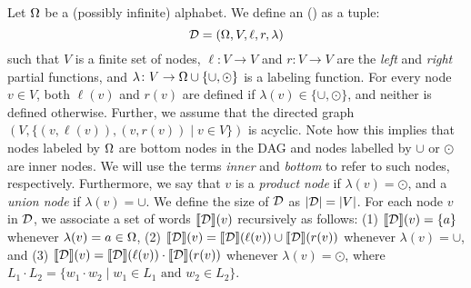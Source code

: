 Let $\Omega$ be a (possibly infinite) alphabet. We define an \emph{\dsnamebigcaps{}} (\dsabbr) as a tuple:
$$
\mathcal{D} = (\Omega, V, \ell, r, \lambda)
$$ 
such that $V$ is a finite set of nodes, $\ell\colon V\to V$ and $r\colon V\to V$ are the {\em left} and {\em right} partial functions, and $\lambda\colon V\to\Omega\cup\{\cup,\odot\}$ is a labeling function. For every node $v\in V$, both $\ell(v)$ and $r(v)$ are defined if $\lambda(v)\in\{\cup,\odot\}$, and neither is defined otherwise. Further, we assume that the directed graph $(V, \{(v,\ell(v)),(v,r(v))\mid v\in V\})$ is acyclic. Note how this implies that nodes labeled by $\Omega$ are bottom nodes in the DAG and nodes labelled by $\cup$ or $\odot$ are inner nodes. We will use the terms {\it inner} and {\it bottom} to refer to such nodes, respectively. Furthermore, we say that $v$ is a {\em product node} if $\lambda(v) = \odot$, and a {\em union node} if $\lambda(v) = \cup$. We define the size of $\mathcal{D}$ as $|\mathcal{D}| = |V|$.
For each node $v$ in $\mathcal{D}$, we associate a set of words ${\llbracket{\mathcal{D}}\rrbracket}(v)$ recursively as follows: (1) ${\llbracket{\mathcal{D}}\rrbracket}(v) = \{a\}$ whenever $\lambda(v) = a\in\Omega$, (2) ${\llbracket{\mathcal{D}}\rrbracket}(v) = {\llbracket{\mathcal{D}}\rrbracket}(\ell(v)) \cup {\llbracket{\mathcal{D}}\rrbracket}(r(v))$ whenever $\lambda(v) = \cup$, and (3) ${\llbracket{\mathcal{D}}\rrbracket}(v) = {\llbracket{\mathcal{D}}\rrbracket}(\ell(v)) \cdot {\llbracket{\mathcal{D}}\rrbracket}(r(v))$ whenever $\lambda(v) = \odot$,
where $L_1 \cdot L_2 = \{w_1\cdot w_2 \mid w_1\in L_1\text{ and }w_2\in L_2\}$.

